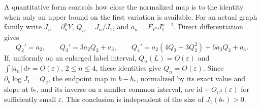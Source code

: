 A quantitative form controls how close the normalized map is to the
identity when only an upper bound on the first variation is available.
For an actual graph family
write \(J_n=\partial_b^nY\), \(Q_n=J_n/J_1\), and
\(a_n=F_{Y^n}J_1^{n-1}\). Direct differentiation gives
\begin{equation}\label{tail:relative-jet-equations}
 Q_2'=a_2,\qquad Q_3'=3a_2Q_2+a_3,\qquad
 Q_4'=a_2(4Q_3+3Q_2^2)+6a_3Q_2+a_4.
\end{equation}
If, uniformly on an enlarged label interval,
\(Q_n(L)=O(\varepsilon)\) and
\(\int|a_n|\,dr=O(\varepsilon)\), \(2\le n\le4\),
these identities give \(Q_n=O(\varepsilon)\).
Since \(\partial_b\log J_1=Q_2\), the endpoint map in \(b-b_*\),
normalized by its exact value and slope at \(b_*\), and its inverse on a
smaller common interval, are \(\mathrm{id}+O_{C^3}(\varepsilon)\)
for sufficiently small \(\varepsilon\).
This conclusion is independent of the size of \(J_1(b_*)>0\).
